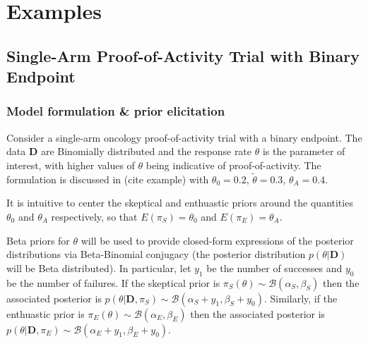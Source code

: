\documentclass[12pt]{article}
\begin{document}



%


\section{Examples}

\subsection{Single-Arm Proof-of-Activity Trial with Binary Endpoint}

\subsubsection{Model formulation \& prior elicitation}

Consider a single-arm oncology proof-of-activity trial with a binary endpoint. The data $\mathbf{D}$ are Binomially distributed and the response rate $\theta$ is the parameter of interest, with higher values of $\theta$ being indicative of proof-of-activity. The formulation is discussed in (cite example) with $\theta_0=0.2$, $\tilde{\theta}=0.3$, $\theta_A=0.4$.

It is intuitive to center the skeptical and enthuastic priors around the quantities $\theta_0$ and $\theta_A$ respectively, so that $E(\pi_S)=\theta_0$ and $E(\pi_E)=\theta_A$.

Beta priors for $\theta$ will be used to provide closed-form expressions of the posterior distributions via Beta-Binomial conjugacy (the posterior distribution $p(\theta|\mathbf{D})$ will be Beta distributed). In particular, let $y_1$ be the number of successes and $y_0$ be the number of failures. If the skeptical prior is $\pi_S(\theta)\sim\mathcal{B}(\alpha_S,\beta_S)$ then the associated posterior is $p(\theta|\mathbf{D},\pi_S)\sim\mathcal{B}(\alpha_S+y_1,\beta_S+y_0)$. Similarly, if the enthuastic prior is $\pi_E(\theta)\sim\mathcal{B}(\alpha_E,\beta_E)$ then the associated posterior is $p(\theta|\mathbf{D},\pi_E)\sim\mathcal{B}(\alpha_E+y_1,\beta_E+y_0)$.
\end{document}
